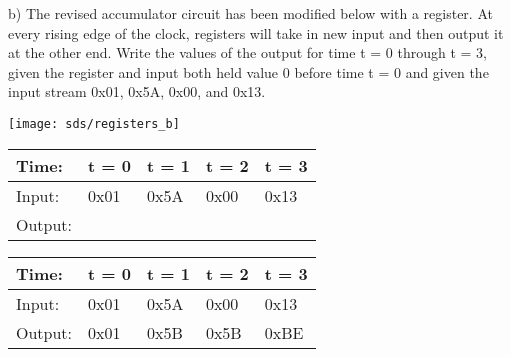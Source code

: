 \begin{blocksection}

\question
b)  The revised accumulator circuit has been modified below with a register.  At every rising edge of the clock, registers will take in new input and then output it at the other end.  Write the values of the output for time t = 0 through t = 3, given the register and input both held value 0 before time t = 0 and given the input stream 0x01, 0x5A, 0x00, and 0x13.

\texttt{[image: sds/registers\_b]}

\begin{tabular}{ |l|l|l|l|l| } 
 \hline
 Time: & t = 0 & t = 1 & t = 2 & t = 3 \\ 
 \hline
 Input: & 0x01 & 0x5A & 0x00 & 0x13 \\ 
 \hline
 Output: &  &  &  &  \\ 
 \hline
\end{tabular}

\begin{solution}
\begin{tabular}{ |l|l|l|l|l| } 
 \hline
 Time: & t = 0 & t = 1 & t = 2 & t = 3 \\ 
 \hline
 Input: & 0x01 & 0x5A & 0x00 & 0x13 \\ 
 \hline
 Output: & 0x01 & 0x5B & 0x5B & 0xBE \\ 
 \hline
\end{tabular}
\end{solution}

\end{blocksection}
